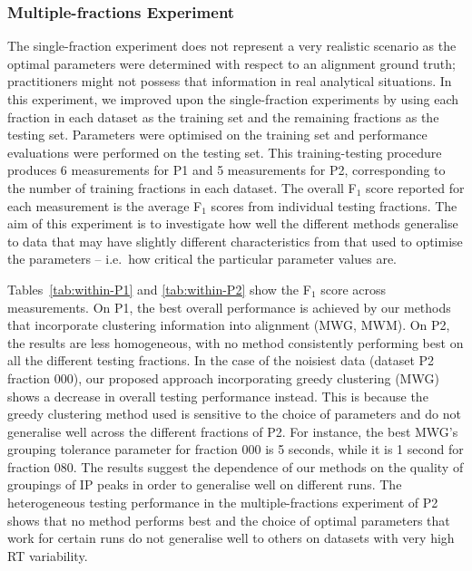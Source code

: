 \subsubsection{Multiple-fractions Experiment}

The single-fraction experiment does not represent a very realistic scenario as the optimal parameters were determined with respect to an alignment ground truth; practitioners might not possess that information in real analytical situations. In this experiment, we improved upon the single-fraction experiments by using each fraction in each dataset as the training set and the remaining fractions as the testing set. Parameters were optimised on the training set and performance evaluations were performed on the testing set. This training-testing procedure produces 6 measurements for P1 and 5 measurements for P2, corresponding to the number of training fractions in each dataset. The overall F$_1$ score reported for each measurement is the average F$_1$ scores from individual testing fractions. The aim of this experiment is to investigate how well the different methods generalise to data that may have slightly different characteristics from that used to optimise the parameters -- i.e.\ how critical the particular parameter values are.

Tables~\ref{tab:within-P1} and \ref{tab:within-P2} show the F$_{1}$ score across measurements. On P1, the best overall performance is achieved by our methods that incorporate clustering information into alignment (MWG, MWM). On P2, the results are less homogeneous, with no method consistently performing best on all the different testing fractions. In the case of the noisiest data (dataset P2 fraction 000), our proposed approach incorporating greedy clustering (MWG) shows a decrease in overall testing performance instead. This is because the greedy clustering method used is sensitive to the choice of parameters and do not generalise well across the different fractions of P2. For instance, the best MWG's grouping tolerance parameter for fraction 000 is 5 seconds, while it is 1 second for fraction 080. The results suggest the dependence of our methods on the quality of groupings of IP peaks in order to generalise well on different runs. The heterogeneous testing performance in the multiple-fractions experiment of P2 shows that no method performs best and the choice of optimal parameters that work for certain runs do not generalise well to others on datasets with very high RT variability.

